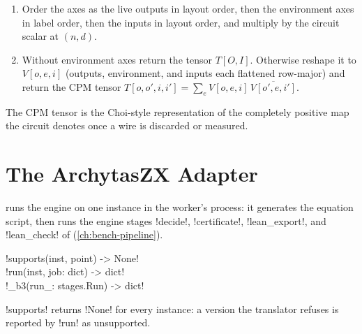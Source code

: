 \begin{algorithm}
\begin{enumerate}
\begin{itemize}
  \item every other gate contracts its tensor (\py!gate_tensor!, or the single-wire matrix) into the live axes of its wires by \py!numpy.tensordot! and puts the new live axes first.
  \end{itemize}
\item Order the axes as the live outputs in layout order, then the environment axes in label order, then the inputs in layout order, and multiply by the circuit scalar at $(n,d)$.
\item Without environment axes return the tensor $T[O,I]$. Otherwise reshape it to $V[o,e,i]$ (outputs, environment, and inputs each flattened row-major) and return the CPM tensor $T[o,o',i,i']=\sum_eV[o,e,i]\,\overline{V[o',e,i']}$.
\end{enumerate}
\end{algorithm}

The CPM tensor is the Choi-style representation of the completely positive map~\cite{selinger2007cpm} the circuit denotes once a wire is discarded or measured.

\section{The ArchytasZX Adapter}\label{sec:bench-tools-azx}

 runs the engine on one instance in the worker's process: it generates the equation script, then runs the engine stages \code!decide!, \code!certificate!, \code!lean_export!, and \code!lean_check! of  (\cref{ch:bench-pipeline}).

\begin{signature}
\py!supports(inst, point) -> None!\\
\py!run(inst, job: dict) -> dict!\\
\py!_b3(run_: stages.Run) -> dict!
\end{signature}

\py!supports! returns \py!None! for every instance: a version the translator refuses is reported by \py!run! as unsupported.

